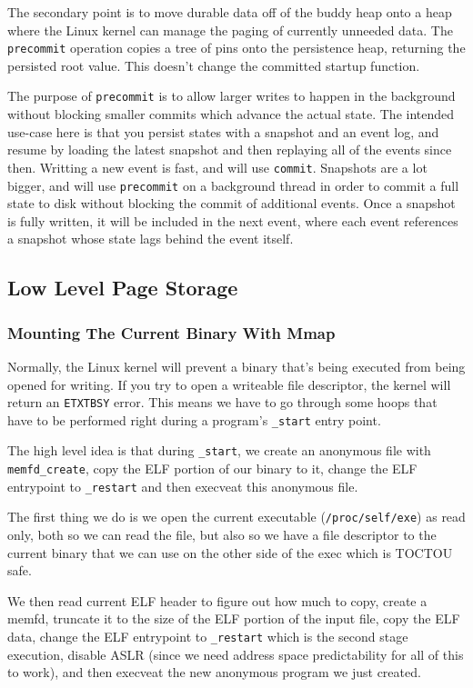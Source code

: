 The secondary point is to move durable data off of the buddy heap onto a heap
where the Linux kernel can manage the paging of currently unneeded
data. The \lstinline|precommit| operation copies a tree of pins onto the
persistence heap, returning the persisted root value. This doesn't change the
committed startup function.

The purpose of \lstinline|precommit| is to allow larger writes to happen
in the background without blocking smaller commits which advance the
actual state.  The intended use-case here is that you persist states with
a snapshot and an event log, and resume by loading the latest snapshot
and then replaying all of the events since then.  Writting a new event is
fast, and will use \lstinline|commit|.  Snapshots are a lot bigger, and
will use \lstinline|precommit| on a background thread in order to commit
a full state to disk without blocking the commit of additional events.
Once a snapshot is fully written, it will be included in the next event,
where each event references a snapshot whose state lags behind the
event itself.

\subsection{Low Level Page Storage}

\subsubsection{Mounting The Current Binary With Mmap}

Normally, the Linux kernel will prevent a binary that's being executed from
being opened for writing. If you try to open a writeable file descriptor, the
kernel will return an \lstinline|ETXTBSY| error. This means we have to go
through some hoops that have to be performed right during a
program's \lstinline|_start| entry point.

The high level idea is that during \lstinline|_start|, we create an anonymous
file with \lstinline|memfd_create|, copy the ELF portion of our binary to it,
change the ELF entrypoint to \lstinline|_restart| and then execveat this
anonymous file.

The first thing we do is we open the current executable
(\lstinline|/proc/self/exe|) as read only, both so we can read the file, but
also so we have a file descriptor to the current binary that we can use on the
other side of the exec which is TOCTOU safe.

We then read current ELF header to figure out how much to copy, create a memfd,
truncate it to the size of the ELF portion of the input file, copy the ELF
data, change the ELF entrypoint to \lstinline|_restart| which is the second
stage execution, disable ASLR (since we need address space predictability for
all of this to work), and then execveat the new anonymous program we just
created.

